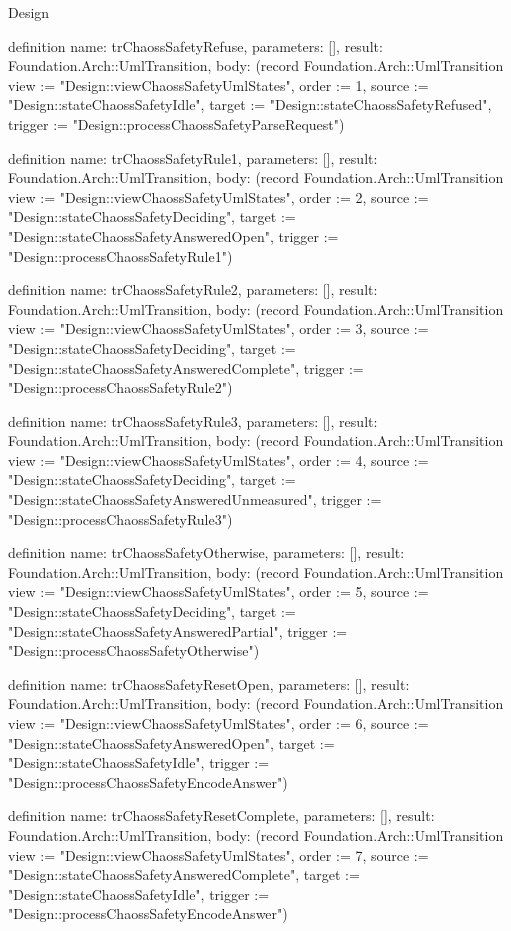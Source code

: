 \begin{lexlean}{Design}
\begin{semanticmodule}
definition{
  name: trChaossSafetyRefuse,
  parameters: [],
  result: Foundation.Arch::UmlTransition,
  body: (record Foundation.Arch::UmlTransition {view := "Design::viewChaossSafetyUmlStates", order := 1, source := "Design::stateChaossSafetyIdle", target := "Design::stateChaossSafetyRefused", trigger := "Design::processChaossSafetyParseRequest"})
}

definition{
  name: trChaossSafetyRule1,
  parameters: [],
  result: Foundation.Arch::UmlTransition,
  body: (record Foundation.Arch::UmlTransition {view := "Design::viewChaossSafetyUmlStates", order := 2, source := "Design::stateChaossSafetyDeciding", target := "Design::stateChaossSafetyAnsweredOpen", trigger := "Design::processChaossSafetyRule1"})
}

definition{
  name: trChaossSafetyRule2,
  parameters: [],
  result: Foundation.Arch::UmlTransition,
  body: (record Foundation.Arch::UmlTransition {view := "Design::viewChaossSafetyUmlStates", order := 3, source := "Design::stateChaossSafetyDeciding", target := "Design::stateChaossSafetyAnsweredComplete", trigger := "Design::processChaossSafetyRule2"})
}

definition{
  name: trChaossSafetyRule3,
  parameters: [],
  result: Foundation.Arch::UmlTransition,
  body: (record Foundation.Arch::UmlTransition {view := "Design::viewChaossSafetyUmlStates", order := 4, source := "Design::stateChaossSafetyDeciding", target := "Design::stateChaossSafetyAnsweredUnmeasured", trigger := "Design::processChaossSafetyRule3"})
}

definition{
  name: trChaossSafetyOtherwise,
  parameters: [],
  result: Foundation.Arch::UmlTransition,
  body: (record Foundation.Arch::UmlTransition {view := "Design::viewChaossSafetyUmlStates", order := 5, source := "Design::stateChaossSafetyDeciding", target := "Design::stateChaossSafetyAnsweredPartial", trigger := "Design::processChaossSafetyOtherwise"})
}

definition{
  name: trChaossSafetyResetOpen,
  parameters: [],
  result: Foundation.Arch::UmlTransition,
  body: (record Foundation.Arch::UmlTransition {view := "Design::viewChaossSafetyUmlStates", order := 6, source := "Design::stateChaossSafetyAnsweredOpen", target := "Design::stateChaossSafetyIdle", trigger := "Design::processChaossSafetyEncodeAnswer"})
}

definition{
  name: trChaossSafetyResetComplete,
  parameters: [],
  result: Foundation.Arch::UmlTransition,
  body: (record Foundation.Arch::UmlTransition {view := "Design::viewChaossSafetyUmlStates", order := 7, source := "Design::stateChaossSafetyAnsweredComplete", target := "Design::stateChaossSafetyIdle", trigger := "Design::processChaossSafetyEncodeAnswer"})
}


\end{semanticmodule}
\end{lexlean}
